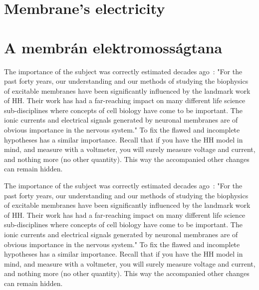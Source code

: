 \ifx\magyar\undefined
	\section[Membrane's electricity]{Membrane's electricity\label{sec:Electricity-Membrane}}
	
\else

	\section[A membrán elektromosságtana]{A membrán elektromosságtana\label{sec:Electricity-Membrane}}
\fi

\ifx\magyar\undefined
The importance of the subject was correctly estimated decades ago~\cite{UpdateHodgkinHuxley:1990}:
"For the past forty years, our understanding and our methods
of studying the biophysics of excitable membranes have been significantly
influenced by the landmark work of \gls{HH}. Their work has
had a far-reaching impact on many different life science sub-disciplines where
concepts of cell biology have come to be important.
The ionic currents and electrical signals generated by
neuronal membranes are of obvious importance in the nervous system."
To fix the flawed and incomplete hypotheses has a similar importance. Recall that if you have the \gls{HH} model in mind, and measure with a voltmeter, you will surely measure
voltage and current, and nothing more (no other quantity). 
This way the accompanied other changes can remain hidden.

\else

The importance of the subject was correctly estimated decades ago~\cite{UpdateHodgkinHuxley:1990}:
"For the past forty years, our understanding and our methods
of studying the biophysics of excitable membranes have been significantly
influenced by the landmark work of \gls{HH}. Their work has
had a far-reaching impact on many different life science sub-disciplines where
concepts of cell biology have come to be important.
The ionic currents and electrical signals generated by
neuronal membranes are of obvious importance in the nervous system."
To fix the flawed and incomplete hypotheses has a similar importance. Recall that if you have the \gls{HH} model in mind, and measure with a voltmeter, you will surely measure
voltage and current, and nothing more (no other quantity). 
This way the accompanied other changes can remain hidden.
\fi



